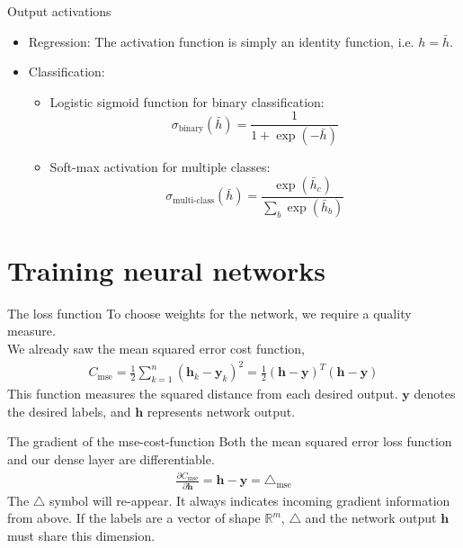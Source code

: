 \documentclass{beamer}
\begin{document}
		\begin{frame}{Output activations}
      \begin{itemize}
				\item Regression: The activation function is simply an identity function, i.e. $h = \bar{h}$.
				\item Classification: 
				\begin{itemize}
					\item Logistic sigmoid function for binary classification: 
						\[\sigma_{\text{binary}}(\bar{h}) = \frac{1}{1+\exp(-\bar{h})}\]
					\item  Soft-max activation for multiple classes: 
					\[ \sigma_{\text{multi-class}}(\bar{h}) = \frac{\exp(\bar{h}_c)}{\sum_b\exp(\bar{h}_b)}\]
				\end{itemize}
			\end{itemize}
    \end{frame}
		
		\section{Training neural networks}

    \begin{frame}{The loss function}
      To choose weights for the network, we require a quality measure. \\
      We already saw the mean squared error cost function,
      \begin{align}
        C_{\text{mse}} = \frac{1}{2} \sum_{k=1}^{n} (\mathbf{h}_k - \mathbf{y}_k)^2 = \frac{1}{2} (\mathbf{h} - \mathbf{y})^T(\mathbf{h} - \mathbf{y})
      \end{align}
      This function measures the squared distance from each desired output.
      $\mathbf{y}$ denotes the desired labels, and $\mathbf{h}$ represents network output.
    \end{frame}


    \begin{frame}{The gradient of the mse-cost-function}
      Both the mean squared error loss function and our dense layer are differentiable. 
      \begin{align}
        \frac{\partial C_{\text{mse}}}{\partial \mathbf{h}} = \mathbf{h} - \mathbf{y} = \triangle_{\text{mse}}
      \end{align}
      The $\triangle$ symbol will re-appear. It always indicates incoming gradient information from above.
      If the labels are a vector of shape $\mathbb{R}^m$, $\triangle$ and the network output $\mathbf{h}$ must share 
      this dimension.
    \end{frame}
\end{document}
